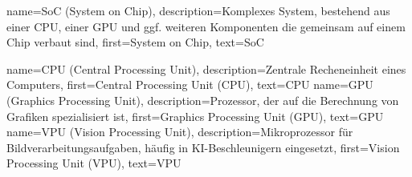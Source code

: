{
    name={SoC (System on Chip)},
    description={Komplexes System, bestehend aus 
    einer CPU, einer GPU und ggf. weiteren 
    Komponenten die gemeinsam auf einem Chip verbaut sind},
    first={System on Chip},
    text={SoC}
}

{
    name={CPU (Central Processing Unit)},
    description={Zentrale Recheneinheit eines Computers},
    first={Central Processing Unit (CPU)},
    text={CPU}
}
{
    name={GPU (Graphics Processing Unit)},
    description={Prozessor, der auf die Berechnung von 
    Grafiken spezialisiert ist},
    first={Graphics Processing Unit (GPU)},
    text={GPU}
}
{
    name={VPU (Vision Processing Unit)},
    description={Mikroprozessor für Bildverarbeitungsaufgaben, 
    häufig in KI-Beschleunigern eingesetzt},
    first={Vision Processing Unit (VPU)},
    text={VPU}
}

